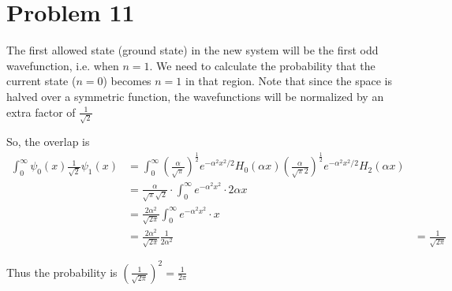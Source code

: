 \documentclass[12pt]{article}
\begin{document}
\section*{Problem 11}
The first allowed state (ground state) in the new system will be the first odd wavefunction, i.e. when $n=1$. We need to calculate the probability that the current state ($n=0$) becomes $n=1$ in that region. Note that since the space is halved over a symmetric function, the wavefunctions will be normalized by an extra factor of $\frac1{\sqrt2}$

So, the overlap is 
\begin{align*}
\int_0^\infty \psi_0(x)\frac1{\sqrt2}\psi_1(x)
&= \int_0^\infty  \left(\frac{\alpha}{\sqrt{\pi}}\right)^{\frac12}e^{-\alpha^2x^2/2}H_0(\alpha x)\left(\frac{\alpha}{\sqrt{\pi}2}\right)^\frac12 e^{-\alpha^2x^2/2}H_2(\alpha x)\\
&= \frac{\alpha}{\sqrt\pi\sqrt2}\cdot \int_0^\infty e^{-\alpha^2x^2}\cdot 2\alpha x\\
&=\frac{2\alpha^2}{\sqrt{2\pi}} \int_0^\infty e^{-\alpha^2x^2}\cdot  x\\
&=\frac{2\alpha^2}{\sqrt{2\pi}}\frac{1}{2\alpha^2}
&=\frac{1}{\sqrt{2\pi}}
\end{align*}

Thus the probability is $\left(\frac1{\sqrt{2\pi}}\right)^2=\boxed{\frac{1}{2\pi}}$
\end{document}
